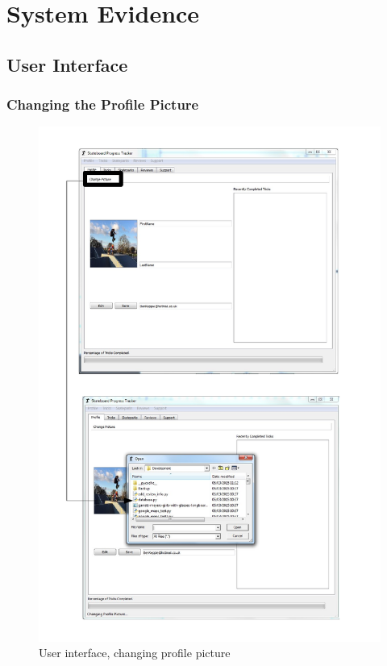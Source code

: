 \section{System Evidence}

\subsection{User Interface}

\subsubsection{Changing the Profile Picture}

\begin{figure}[H]
    \includegraphics[width=\textwidth]{./Maintenance/Figures/ChangePicture.pdf}
    \caption{User interface, changing profile picture} \label{fig:Changing Picture UI}
\end{figure}

